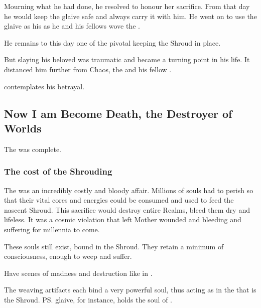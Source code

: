 Mourning what he had done, he resolved to honour her sacrifice. 
From that day he would keep the glaive safe and always carry it with him. 
He went on to use the glaive as his  as he and his fellows wove the . 

He remains to this day one of the pivotal \vertices{} keeping the Shroud in place.

But slaying his beloved was traumatic and became a turning point in his life. It distanced him further from Chaos, the \firstgendragons{} and his fellow \dragons.

\Ishnaruchaefir{} contemplates his betrayal. 










\subsection{Now I am Become Death, the Destroyer of Worlds}
The \SecondShrouding{} was complete. 





\subsubsection{The cost of the Shrouding}
The \SecondShrouding{} was an incredibly costly and bloody affair. 
Millions of souls had to perish so that their vital cores and energies could be consumed and used to feed the nascent Shroud. 
This sacrifice would destroy entire Realms, bleed them dry and lifeless. 
It was a cosmic violation that left Mother \Miith{} wounded and bleeding and suffering for millennia to come. 

These souls still exist, bound in the Shroud. 
They retain a minimum of consciousness, enough to weep and suffer. 

Have scenes of madness and destruction like in \cite{HPLovecraft:TheCrawlingChaos}. 

The weaving artifacts each bind a very powerful soul, thus acting as \vertices{} in the \matrix{} that is the Shroud. \ps{\Ishnaruchaefir} glaive, for instance, holds the soul of \Triestessakhin. 

